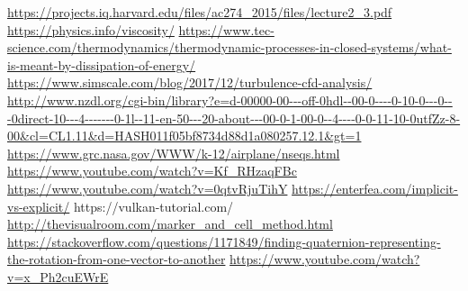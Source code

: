 \documentclass{article}
\begin{document}
\begin{thebibliography}{3}
\url{https://projects.iq.harvard.edu/files/ac274_2015/files/lecture2_3.pdf}
\url{https://physics.info/viscosity/}
\url{https://www.tec-science.com/thermodynamics/thermodynamic-processes-in-closed-systems/what-is-meant-by-dissipation-of-energy/}
\url{https://www.simscale.com/blog/2017/12/turbulence-cfd-analysis/}
\url{http://www.nzdl.org/cgi-bin/library?e=d-00000-00---off-0hdl--00-0----0-10-0---0---0direct-10---4-------0-1l--11-en-50---20-about---00-0-1-00-0--4----0-0-11-10-0utfZz-8-00\&cl=CL1.11\&d=HASH011f05bf8734d88d1a080257.12.1\&gt=1}
\url{https://www.grc.nasa.gov/WWW/k-12/airplane/nseqs.html}
\url{https://www.youtube.com/watch?v=Kf_RHzaqFBc}
\url{https://www.youtube.com/watch?v=0qtvRjuTihY}
\url{https://enterfea.com/implicit-vs-explicit/}
https://vulkan-tutorial.com/
\url{http://thevisualroom.com/marker_and_cell_method.html}
\url{https://stackoverflow.com/questions/1171849/finding-quaternion-representing-the-rotation-from-one-vector-to-another}
\url{https://www.youtube.com/watch?v=x_Ph2cuEWrE}
\end{thebibliography}
\end{document}
